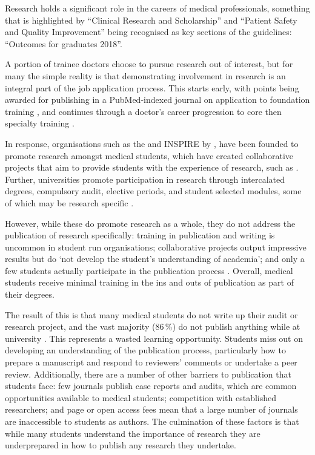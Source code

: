 Research holds a significant role in the careers of medical professionals, something that is highlighted by ``Clinical Research and Scholarship'' and ``Patient Safety and Quality Improvement'' being recognised as key sections of the \cite{GeneralMedicalCouncil2018} guidelines: ``Outcomes for graduates 2018''.

A portion of trainee doctors choose to pursue research out of interest, but for many the simple reality is that demonstrating involvement in research is an integral part of the job application process. This starts early, with points being awarded for publishing in a PubMed-indexed journal on application to foundation training \citep{UKFoundationProgramme2018}, and continues through a doctor's career progression to core then specialty training \citep{HealthEducationEngland2018,HealthEducationEngland2018a}.

In response, organisations such as the \citeauthor{NSAMR2018} and INSPIRE by \citeauthor{TheAcademyofMedicalSciences2018}, have been founded to promote research amongst medical students, which have created collaborative projects that aim to provide students with the experience of research, such as \citeauthor{STARSurg2018}. Further, universities promote participation in research through intercalated degrees, compulsory audit, elective periods, and student selected modules, some of which may be research specific \citep{Lundin2016}.

However, while these do promote research as a whole, they do not address the publication of research specifically: training in publication and writing is uncommon in student run organisations; collaborative projects output impressive results but do `not develop the student's understanding of academia'; and only a few students actually participate in the publication process \citep{Ashcroft2017}. Overall, medical students receive minimal training in the ins and outs of publication as part of their degrees.

The result of this is that many medical students do not write up their audit or research project, and the vast majority (86\,\%) do not publish anything while at university \citep{Griffin2011}. This represents a wasted learning opportunity. Students miss out on developing an understanding of the publication process, particularly how to prepare a manuscript and respond to reviewers' comments or undertake a peer review. Additionally, there are a number of other barriers to publication that students face: few journals publish case reports and audits, which are common opportunities available to medical students; competition with established researchers; and page or open access fees mean that a large number of journals are inaccessible to students as authors. The culmination of these factors is that while many students understand the importance of research they are underprepared in how to publish any research they undertake.

